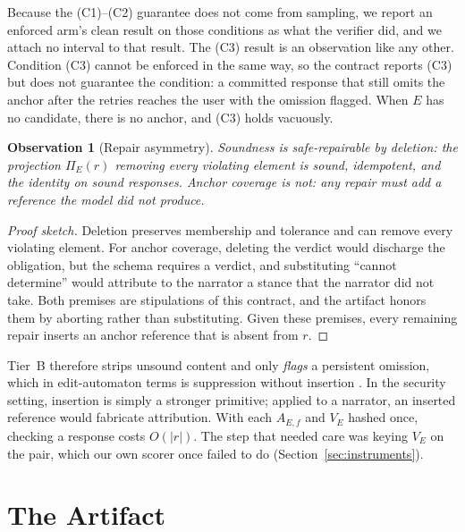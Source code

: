 \documentclass[10pt,twocolumn]{article}
\newtheorem{observation}{Observation}
\begin{document}
Because the (C1)--(C2) guarantee does not come from sampling, we report an
enforced arm's clean result on those conditions as what the verifier did, and
we attach no interval to that result. The (C3) result is an observation like
any other. Condition (C3) cannot be enforced in the same way, so the contract
reports (C3) but does not guarantee the condition: a committed response that still omits
the anchor after the retries reaches the user with the omission flagged. When
$E$ has no candidate, there is no anchor, and (C3) holds vacuously.

\begin{observation}[Repair asymmetry]\label{prop:asym}
Soundness is safe-repairable by deletion: the projection $\Pi_E(r)$ removing
every violating element is sound, idempotent, and the identity on sound
responses. Anchor coverage is not: any repair must add a reference the model
did not produce.
\end{observation}

\begin{proof}[Proof sketch]
Deletion preserves membership and tolerance and can remove every violating
element. For anchor coverage, deleting the verdict would discharge the
obligation, but the schema requires a verdict, and substituting ``cannot
determine'' would attribute to the narrator a stance that the narrator did not
take. Both premises are stipulations of this contract, and the artifact honors
them by aborting rather than substituting. Given these premises, every
remaining repair inserts an anchor reference that is absent from $r$.
\end{proof}

Tier~B therefore strips unsound content and only \emph{flags} a persistent
omission, which in edit-automaton terms is suppression without
insertion \citep{ligatti2005edit}. In the security setting, insertion is simply
a stronger primitive; applied to a narrator, an inserted reference would
fabricate attribution. With each $A_{E,f}$ and $V_E$ hashed once, checking a
response costs $O(|r|)$. The step that needed care was keying $V_E$ on the
pair, which our own scorer once failed to do (Section~\ref{sec:instruments}).

\section{The Artifact}\label{sec:contract}
\end{document}
